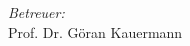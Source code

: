 \documentclass[a4paper,ngerman,oneside,titlepage,11pt]{scrreprt}
\theoremstyle{remark}
\begin{document}
\begin{titlepage}
\begin{minipage}[t]{0.4\textwidth}
\begin{flushright}
\emph{Betreuer:}\\[2mm]
Prof. Dr. Göran Kauermann\\[6mm]
\end{flushright}
\end{minipage}\\[4.5cm]






 


\end{titlepage}
\end{document}
